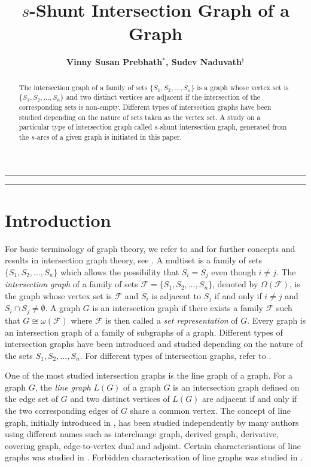\documentclass[12pt,a4paper,twoside]{article}
\title{\sc $s$-Shunt Intersection Graph of a Graph}
\author{{\bf Vinny Susan Prebhath$^\ast$, Sudev Naduvath$^\dag$}}
\affil{\small Centre for Mathematical Needs\\Department of Mathematics\\ Christ University, Bangalore, India. \\ $^\ast${\tt vinny.prebhath@res.christuniversity.in}\\ 
$^\dag${\tt sudev.nk@christuniversity.in}
}
\date{}
\theoremstyle{casesty}
\theoremstyle{subcasesty}
\theoremstyle{schemesty}
\begin{document}
\maketitle

\hrule
\begin{abstract}
The intersection graph of a family of sets $\{S_{1},S_{2},\ldots,S_{n}\}$ is a graph whose vertex set is $\{S_{1},S_{2},\ldots,S_{n}\}$ and two distinct vertices are adjacent if the intersection of the corresponding sets is non-empty. Different types of intersection graphs have been studied depending on the nature of sets taken as the vertex set. A study on a particular type of intersection graph called $s$-shunt intersection graph, generated from the $s$-arcs of a given graph is initiated in this paper.
\vspace{0.2cm}

\end{abstract}\vspace{0.2cm}
\hrule

\section{Introduction}

For basic terminology of graph theory, we refer to \cite{harary2018graph} and for further concepts and results in intersection graph theory, see \cite{mckee1999topics}. A multiset is a family of sets $\{S_{1}, S_{2},\ldots, S_{n}\}$ which allows the possibility that $S_{i} = S_{j}$ even though $i \neq j$. The \emph{intersection graph} of a family of sets $\mathscr{F}=\{S_{1}, S_{2},\ldots, S_{n}\}$, denoted by $\Omega(\mathscr{F})$, is the graph whose vertex set is $\mathscr{F}$ and $S_{i}$ is adjacent to $S_{j}$ if and only if $i\neq j$ and $S_{i} \cap S_{j} \neq \emptyset$. A graph $G$ is an intersection graph if there exists a family $\mathscr{F}$ such that $G \cong \omega(\mathscr{F})$ where $\mathscr{F}$ is then called a \emph{set representation} of $G$. Every graph is an intersection graph of a family of subgraphs of a graph. Different types of intersection graphs have been introduced and studied depending on the nature of the sets $S_{1}, S_{2},\ldots,S_{n}$. For different types of intersection graphs, refer to \cite{mckee1999topics}. 

One of the most studied intersection graphs is the line graph of a graph. For a graph $G$, the \emph{line graph} $L(G)$ of a graph $G$ is an intersection graph defined on the edge set of $G$ and two distinct vertices of $L(G)$ are adjacent if and only if the two corresponding edges of $G$ share a common vertex. The concept of line graph, initially introduced in \cite{whitney1992congruent}, has been studied independently by many authors using different names such as interchange graph, derived graph, derivative, covering graph, edge-to-vertex dual and adjoint. Certain characterisations of line graphs was studied in \cite{ray1967characterization}. Forbidden characterisation of line graphs was studied in \cite{beineke1970characterizations}. 
\end{document}

